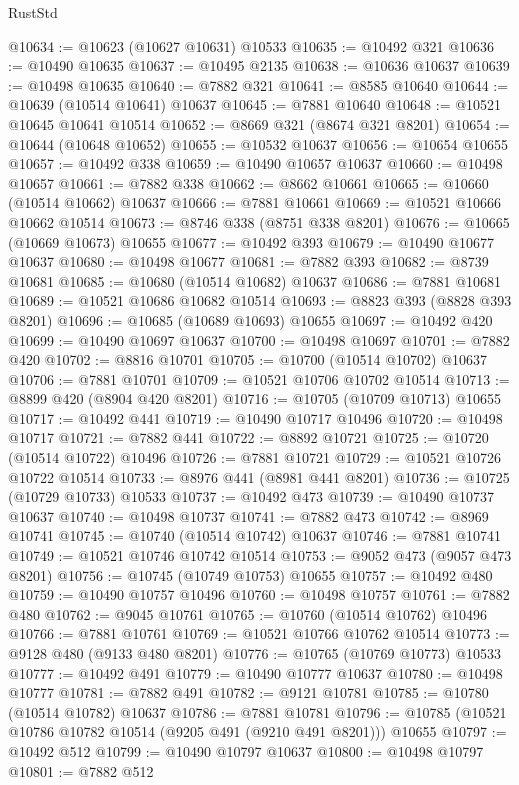 \begin{lexlean}{RustStd}
\begin{coremodule}
@10634 := @10623 (@10627 @10631) @10533
@10635 := @10492 @321
@10636 := @10490 @10635
@10637 := @10495 @2135
@10638 := @10636 @10637
@10639 := @10498 @10635
@10640 := @7882 @321
@10641 := @8585 @10640
@10644 := @10639 (@10514 @10641) @10637
@10645 := @7881 @10640
@10648 := @10521 @10645 @10641 @10514
@10652 := @8669 @321 (@8674 @321 @8201)
@10654 := @10644 (@10648 @10652)
@10655 := @10532 @10637
@10656 := @10654 @10655
@10657 := @10492 @338
@10659 := @10490 @10657 @10637
@10660 := @10498 @10657
@10661 := @7882 @338
@10662 := @8662 @10661
@10665 := @10660 (@10514 @10662) @10637
@10666 := @7881 @10661
@10669 := @10521 @10666 @10662 @10514
@10673 := @8746 @338 (@8751 @338 @8201)
@10676 := @10665 (@10669 @10673) @10655
@10677 := @10492 @393
@10679 := @10490 @10677 @10637
@10680 := @10498 @10677
@10681 := @7882 @393
@10682 := @8739 @10681
@10685 := @10680 (@10514 @10682) @10637
@10686 := @7881 @10681
@10689 := @10521 @10686 @10682 @10514
@10693 := @8823 @393 (@8828 @393 @8201)
@10696 := @10685 (@10689 @10693) @10655
@10697 := @10492 @420
@10699 := @10490 @10697 @10637
@10700 := @10498 @10697
@10701 := @7882 @420
@10702 := @8816 @10701
@10705 := @10700 (@10514 @10702) @10637
@10706 := @7881 @10701
@10709 := @10521 @10706 @10702 @10514
@10713 := @8899 @420 (@8904 @420 @8201)
@10716 := @10705 (@10709 @10713) @10655
@10717 := @10492 @441
@10719 := @10490 @10717 @10496
@10720 := @10498 @10717
@10721 := @7882 @441
@10722 := @8892 @10721
@10725 := @10720 (@10514 @10722) @10496
@10726 := @7881 @10721
@10729 := @10521 @10726 @10722 @10514
@10733 := @8976 @441 (@8981 @441 @8201)
@10736 := @10725 (@10729 @10733) @10533
@10737 := @10492 @473
@10739 := @10490 @10737 @10637
@10740 := @10498 @10737
@10741 := @7882 @473
@10742 := @8969 @10741
@10745 := @10740 (@10514 @10742) @10637
@10746 := @7881 @10741
@10749 := @10521 @10746 @10742 @10514
@10753 := @9052 @473 (@9057 @473 @8201)
@10756 := @10745 (@10749 @10753) @10655
@10757 := @10492 @480
@10759 := @10490 @10757 @10496
@10760 := @10498 @10757
@10761 := @7882 @480
@10762 := @9045 @10761
@10765 := @10760 (@10514 @10762) @10496
@10766 := @7881 @10761
@10769 := @10521 @10766 @10762 @10514
@10773 := @9128 @480 (@9133 @480 @8201)
@10776 := @10765 (@10769 @10773) @10533
@10777 := @10492 @491
@10779 := @10490 @10777 @10637
@10780 := @10498 @10777
@10781 := @7882 @491
@10782 := @9121 @10781
@10785 := @10780 (@10514 @10782) @10637
@10786 := @7881 @10781
@10796 := @10785 (@10521 @10786 @10782 @10514 (@9205 @491 (@9210 @491 @8201))) @10655
@10797 := @10492 @512
@10799 := @10490 @10797 @10637
@10800 := @10498 @10797
@10801 := @7882 @512

\end{coremodule}
\end{lexlean}
